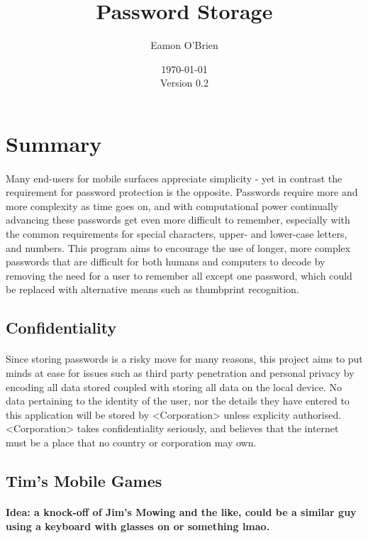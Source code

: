 \documentclass{article}
\title{Password Storage}
\date{\today\\Version 0.2}
\author{Eamon O'Brien}
\begin{document}
	\maketitle
	\newpage

	\section{Summary}
	\paragraph{}
Many end-users for mobile surfaces appreciate simplicity - yet in contrast the requirement for password protection is the opposite. Passwords require more and more complexity as time goes on, and with computational power continually advancing these passwords get even more difficult to remember, especially with the common requirements for special characters, upper- and lower-case letters, and numbers. This program aims to encourage the use of longer, more complex passwords that are difficult for both humans and computers to decode by removing the need for a user to remember all except one password, which could be replaced with alternative means such as thumbprint recognition.

	\subsection{Confidentiality}
	\paragraph{}
Since storing passwords is a risky move for many reasons, this project aims to put minds at ease for issues such as third party penetration and personal privacy by encoding all data stored coupled with storing all data on the local device. No data pertaining to the identity of the user, nor the details they have entered to this application will be stored by <Corporation> unless explicity authorised. <Corporation> takes confidentiality seriously, and believes that the internet must be a place that no country or corporation may own.

	\subsection{Tim's Mobile Games}
	\paragraph{Idea: a knock-off of Jim's Mowing and the like, could be a similar guy using a keyboard with glasses on or something lmao.}
\end{document}
